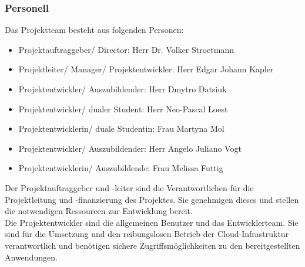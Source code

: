 \subsubsection{Personell}
\label{sec:Personell}
Das Projektteam besteht aus folgenden Personen:
\begin{itemize} [label=--]
	\item Projektauftraggeber/ Director: Herr Dr. Volker Stroetmann
	\item Projektleiter/ Manager/ Projektentwickler: Herr Edgar Johann Kapler
	\item Projektentwickler/ Auszubildender: Herr Dmytro Datsiuk
	\item Projektentwickler/ dualer Student: Herr Neo-Pascal Loest
	\item Projektentwicklerin/ duale Studentin: Frau Martyna Mol 
	\item Projektentwickler/ Auszubildender: Herr Angelo Juliano Vogt
	\item Projektentwicklerin/ Auszubildende: Frau Melissa Futtig
\end{itemize}
Der Projektauftraggeber und -leiter sind die Verantwortlichen für die Projektleitung und -finanzierung des Projektes. 
Sie genehmigen dieses und stellen die notwendigen Ressourcen zur Entwicklung bereit.
\\Die Projektentwickler sind die allgemeinen Benutzer und das Entwicklerteam. Sie sind für die Umsetzung und den 
reibungslosen Betrieb der Cloud-Infrastruktur verantwortlich und benötigen sichere Zugriffsmöglichkeiten zu den 
bereitgestellten Anwendungen.